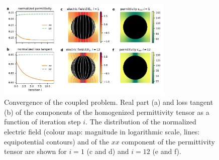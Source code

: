 \documentclass[%
 aip,
 amsmath,amssymb,
 reprint,%
]{revtex4-1}
\begin{document}
\begin{figure}[!t]
 \centering
 \includegraphics[width=0.75\textwidth]{convergence_per}
 \caption{Convergence of the coupled problem.
  Real part (a) and loss tangent (b) of the components of the homogenized
  permittivity tensor as a function of iteration step $i$. The distribution of
  the normalized electric field (colour map: magnitude in logarithmic scale,
  lines: equipotential contours) and of the
  $xx$ component of the permittivity tensor are shown for $i=1$
  (c and d) and $i=12$ (e and f).
 }
 \label{conv2D}
\end{figure}

\end{document}
